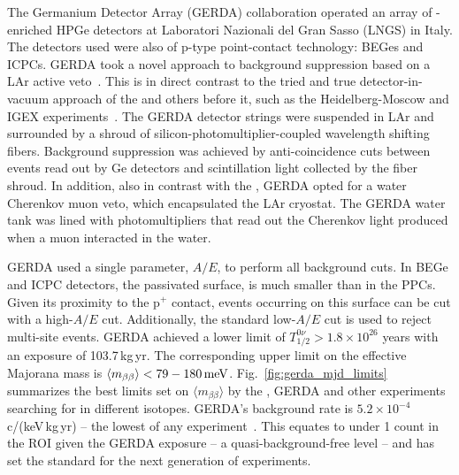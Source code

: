 The Germanium Detector Array (GERDA) collaboration operated an array of \geEn{}-enriched HPGe detectors at Laboratori Nazionali del Gran Sasso (LNGS) in Italy. The detectors used were also of p-type point-contact technology: BEGes and ICPCs. GERDA took a novel approach to background suppression based on a LAr active veto~\cite{lar_veto}.  This is in direct contrast to the tried and true detector-in-vacuum approach of the {\MJDEMit} and others before it, such as the Heidelberg-Moscow and IGEX experiments~\cite{h-m, igex}. The GERDA detector strings were suspended in LAr and surrounded by a shroud of silicon-photomultiplier-coupled wavelength shifting fibers. Background suppression was achieved by anti-coincidence cuts between events read out by Ge detectors and scintillation light collected by the fiber shroud. In addition, also in contrast with the {\DEMit}, GERDA opted for a water Cherenkov muon veto, which encapsulated the LAr cryostat. The GERDA water tank was lined with photomultipliers that read out the Cherenkov light produced when a muon interacted in the water. 

GERDA used a single parameter, $A/E$, to perform all background cuts. In BEGe and ICPC detectors, the passivated surface, is much smaller than in the {\MJMit} PPCs. Given its proximity to the p$^+$ contact, events occurring on this surface can be cut with a high-$A/E$ cut. Additionally, the standard low-$A/E$ cut is used to reject multi-site events. GERDA achieved a lower limit of $T^{0\nu}_{1/2} > 1.8\times10^{26}$ years with an exposure of 103.7\,kg\,yr. The corresponding upper limit on the effective Majorana mass is $\langle m_{\beta\beta} \rangle < 79-180\text{\,meV}$. Fig.~\ref{fig:gerda_mjd_limits} summarizes the best limits set on $\langle m_{\beta\beta} \rangle$ by the {\MJDEMit}, GERDA and other experiments searching for \novbb{} in different isotopes. GERDA's background rate is $5.2\times10^{-4}$ c/(keV\,kg\,yr) -- the lowest of any \novbb{} experiment~\cite{GERDA2020}. This equates to under 1 count in the ROI given the GERDA exposure -- a quasi-background-free level -- and has set the standard for the next generation of experiments.


